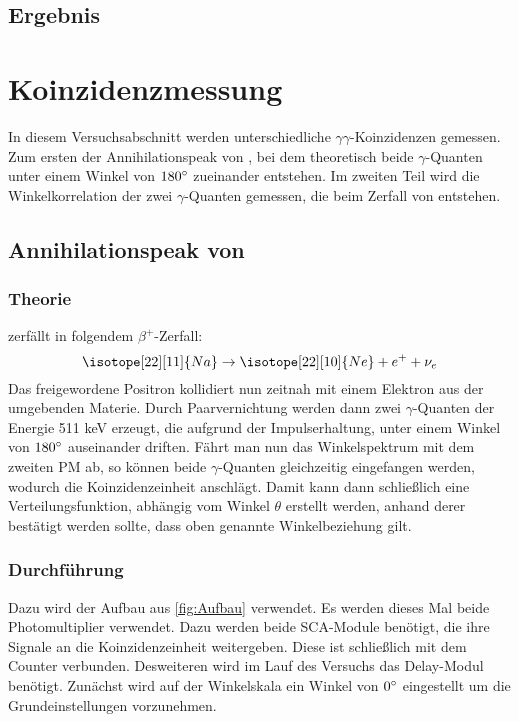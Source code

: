 \documentclass{../Misc/MontavonLaTeX/Montavon}
\begin{document}
\subsection{Ergebnis}


\section{Koinzidenzmessung}
In diesem Versuchsabschnitt werden unterschiedliche $\gamma\gamma$-Koinzidenzen gemessen. Zum ersten der Annihilationspeak von , bei dem theoretisch beide $\gamma$-Quanten unter einem Winkel von $180 ^{\circ}$ zueinander entstehen. 
Im zweiten Teil wird die Winkelkorrelation der zwei $\gamma$-Quanten gemessen, die beim Zerfall von  entstehen. 
\subsection{Annihilationspeak von }
\subsubsection{Theorie}
 zerfällt in folgendem $\beta^{+}$-Zerfall:
\begin{equation}
\isotope[22][11]{Na} \rightarrow \isotope[22][10]{Ne} + e^{+} + \nu_{e}
\end{equation}
Das freigewordene Positron kollidiert nun zeitnah mit einem Elektron aus der umgebenden Materie. Durch Paarvernichtung werden dann zwei $\gamma$-Quanten der Energie 511 keV erzeugt, die aufgrund der Impulserhaltung, unter einem Winkel von $180 ^{\circ}$ auseinander driften. 
Fährt man nun das Winkelspektrum mit dem zweiten PM ab, so können beide $\gamma$-Quanten gleichzeitig eingefangen werden, wodurch die Koinzidenzeinheit anschlägt. Damit kann dann schließlich eine Verteilungsfunktion, abhängig vom Winkel $\theta$ erstellt werden, anhand derer 
bestätigt werden sollte, dass oben genannte Winkelbeziehung gilt.
\subsubsection{Durchführung}
Dazu wird der Aufbau aus \ref{fig:Aufbau} verwendet. Es werden dieses Mal beide Photomultiplier verwendet. Dazu werden beide SCA-Module benötigt, die ihre Signale an die Koinzidenzeinheit weitergeben. Diese ist schließlich mit dem Counter verbunden. Desweiteren wird im Lauf des Versuchs das Delay-Modul benötigt. 
Zunächst wird auf der Winkelskala ein Winkel von $0 ^{\circ}$ eingestellt um die Grundeinstellungen vorzunehmen. 
\end{document}
